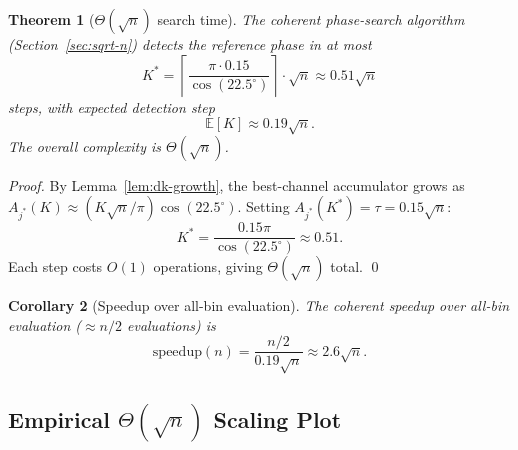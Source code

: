 \documentclass[12pt,a4paper]{article}
\theoremstyle{plain}
\newtheorem{theorem}{Theorem}[section]
\newtheorem{corollary}[theorem]{Corollary}
\theoremstyle{definition}
\theoremstyle{remark}
\begin{document}
\begin{theorem}[$\Theta(\sqrt{n})$ search time]\label{thm:main-sqrt}
  The coherent phase-search algorithm (Section~\ref{sec:sqrt-n}) detects
  the reference phase in at most
  \begin{equation}
    K^* = \left\lceil \frac{\pi\cdot 0.15}{\cos(22.5^\circ)} \right\rceil
          \cdot \sqrt{n}
        \approx 0.51\sqrt{n}
    \label{eq:Kstar}
  \end{equation}
  steps, with expected detection step
  \begin{equation}
    \mathbb{E}[K] \approx 0.19\sqrt{n}.
    \label{eq:EK}
  \end{equation}
  The overall complexity is $\Theta(\sqrt{n})$.
\end{theorem}

\begin{proof}
  By Lemma~\ref{lem:dk-growth}, the best-channel accumulator grows as
  $A_{j^*}(K) \approx (K\sqrt{n}/\pi)\cos(22.5^\circ)$.  Setting
  $A_{j^*}(K^*) = \tau = 0.15\sqrt{n}$:
  \[
    K^* = \frac{0.15\pi}{\cos(22.5^\circ)} \approx 0.51.
  \]
  Each step costs $O(1)$ operations, giving $\Theta(\sqrt{n})$ total. \qed
\end{proof}

\begin{corollary}[Speedup over all-bin evaluation]\label{cor:speedup}
  The coherent speedup over all-bin evaluation ($\approx n/2$ evaluations) is
  \begin{equation}
    \mathrm{speedup}(n) = \frac{n/2}{0.19\sqrt{n}} \approx 2.6\sqrt{n}.
    \label{eq:speedup}
  \end{equation}
\end{corollary}

\subsection{Empirical \texorpdfstring{$\Theta(\sqrt{n})$}{Theta(sqrt(n))} Scaling Plot}

\begin{center}
\end{center}
\end{document}

